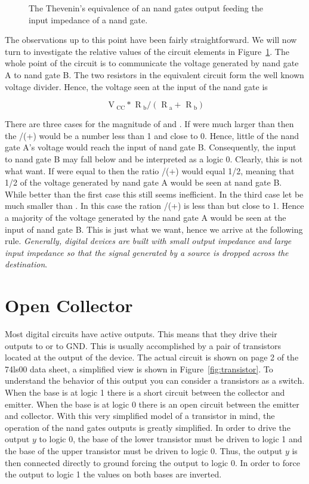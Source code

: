 \begin{figure}[ht]
\caption{The Thevenin's equivalence of an nand gates output feeding the
input impedance of a nand gate.}
\label{fig:impedance}
\end{figure}

The observations up to this point have been fairly straightforward.
We will now turn to investigate the relative values of the circuit
elements in Figure~\ref{fig:impedance}.  The whole point of the
circuit is to communicate the voltage generated by nand gate A to
nand gate B.  The two resistors in the equivalent circuit form the
well known voltage divider.  Hence, the voltage seen at the input
of the nand gate is 

	$$ \text{ V}_\text{ CC}  *
		\text{ R}_\text{ b}  / 
		( \text{ R}_\text{ a} + \text{ R}_\text{ b} ) $$


There are three
cases for the magnitude of \Ra and \Rb.  If \Ra were much larger
than \Rb then the \Rb/(\Ra+\Rb) would be a number less than 1 
and close to 0.  Hence, little of the nand gate A's voltage 
would reach the input of nand gate B.  Consequently, the input
to nand gate B may fall below \VIL and be interpreted as a logic
0.  Clearly, this is not
what want.  If \Ra were equal to \Rb then the ratio \Rb/(\Ra+\Rb) 
would equal 1/2, meaning that 1/2 of the voltage generated by nand
gate A would be seen at nand gate B.  While better than the first
case this still seems inefficient.  In the third case let
\Ra be much smaller than \Rb.  In this case the ration \Rb/(\Ra+\Rb)
is less than but close to 1.  Hence a majority of the voltage
generated by the nand gate A would be seen at the input of nand gate
B. This is just what we want, hence we arrive at the following
rule. \textit{ Generally, digital devices are built with small output
impedance and large input impedance so that the signal
generated by a source is dropped across the destination}.

\section{Open Collector}
Most digital circuits have active outputs.  This means that they drive 
their outputs to \VCC or to GND.  This is usually accomplished 
by a pair of transistors located at the output of the device.  The 
actual circuit is shown on page 2 of the 74ls00 data sheet,
a simplified view is shown in Figure~\ref{fig:transistor}.  To 
understand the behavior of this output you can consider 
a transistors as a switch.  When the base is at logic 1 there is
a short circuit between the collector and emitter.  When the base is 
at logic 0 there is an open circuit between the emitter and
collector.  With this very simplified model of a transistor in mind,
the operation of the nand gates outputs is greatly simplified.  In
order to drive the output $y$ to logic 0, the base of the lower 
transistor must be driven to logic 1 and the base of the upper
transistor must be driven to logic 0.  Thus, the output $y$ is then
connected directly to ground forcing the output to logic 0.  In order
to force the output to logic 1 the values on both bases are inverted.

